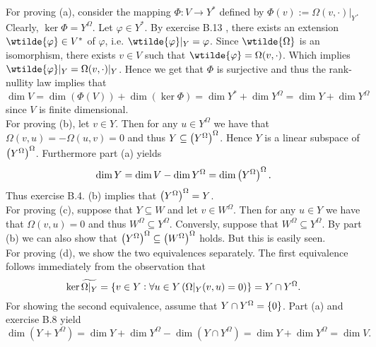 \begin{solution}
	For proving (a), consider the mapping $\Phi : V \to Y^*$ defined by $\Phi(v) := \Omega(v,\cdot)\vert_Y$. Clearly, $\ker \Phi = Y^\Omega$. Let $\varphi \in Y^*$. By exercise B.13 \cite[623]{lee:smooth_manifolds:2013}, there exists an extension $\wtilde{\varphi} \in V^*$ of $\varphi$, i.e. $\wtilde{\varphi}\vert_Y = \varphi$. Since $\wtilde{\Omega}$ is an isomorphism, there exists $v \in V$ such that $\wtilde{\varphi} = \Omega(v,\cdot)$. Which implies $\wtilde{\varphi}\vert_Y = \Omega(v,\cdot)\vert_Y$. Hence we get that $\Phi$ is surjective and thus the rank-nullity law \cite[627]{lee:smooth_manifolds:2013} implies that 
\begin{equation*}
	\dim V = \dim(\Phi(V)) + \dim(\ker\Phi) = \dim Y^* + \dim Y^\Omega = \dim Y + \dim Y^\Omega
\end{equation*}
\noindent since $V$ is finite dimensional.\\
For proving (b), let $v \in Y$. Then for any $u \in Y^\Omega$ we have that $\Omega(v,u) = - \Omega(u,v) = 0$ and thus $Y \subseteq \del[1]{Y^\Omega}^\Omega$. Hence $Y$ is a linear subspace of $\del[1]{Y^\Omega}^\Omega$. Furthermore part (a) yields
\begin{equation*}
\dim Y = \dim V - \dim Y^\Omega = \dim \del[1]{Y^\Omega}^\Omega.
\end{equation*}
\noindent Thus exercise B.4. (b) \cite[620]{lee:smooth_manifolds:2013} implies that $\del[1]{Y^\Omega}^\Omega = Y$.\\
For proving (c), suppose that $Y \subseteq W$ and let $v \in W^\Omega$. Then for any $u \in Y$ we have that $\Omega(v,u) = 0$ and thus $W^\Omega \subseteq Y^\Omega$. Conversly, suppose that $W^\Omega \subseteq Y^\Omega$. By part (b) we can also show that $\del[1]{Y^\Omega}^\Omega \subseteq \del[1]{W^\Omega}^\Omega$ holds. But this is easily seen.\\
For proving (d), we show the two equivalences separately. The first equivalence follows immediately from the observation that
\begin{equation*}
	\ker \widetilde{\Omega\vert_{Y}} = \cbr[0]{v \in Y : \forall u \in Y\del[0]{\Omega\vert_Y(v,u) = 0}} = Y \cap Y^\Omega.
\end{equation*}
For showing the second equivalence, assume that $Y \cap Y^\Omega = \cbr[0]{0}$. Part (a) and exercise B.8 \cite[621]{lee:smooth_manifolds:2013} yield
\begin{equation*}
\dim(Y + Y^\Omega) = \dim Y + \dim Y^\Omega - \dim(Y \cap Y^\Omega) = \dim Y + \dim Y^\Omega = \dim V.

\end{equation*}
\end{solution}
